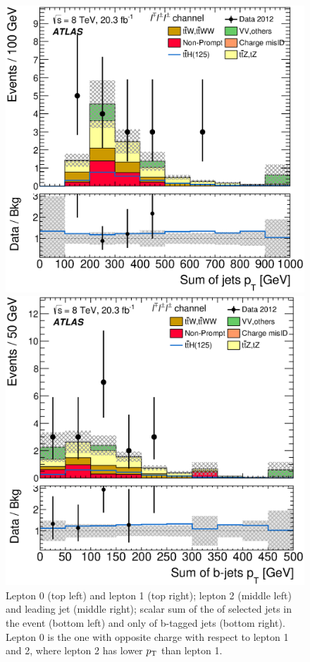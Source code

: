 \begin{figure}[!htbp]
\begin{minipage}[h]{0.4\textwidth}
  \end{minipage}\hfill
  \begin{minipage}[h]{0.4\textwidth}
    \centering \includegraphics[width=\textwidth]{figs/results/results_new/3lep_SR_SumPtJet}
  \end{minipage}\hfill
  \begin{minipage}[h]{0.4\textwidth}
    \centering \includegraphics[width=\textwidth]{figs/results/results_new/3lep_SR_SumPtBJet}
  \end{minipage}\hfill
  \caption{Lepton 0 \pt (top left) and lepton 1 \pt (top right); 
    lepton 2 \pt (middle left) and leading jet \pt (middle right); 
    scalar sum of the \pt of selected jets in the event (bottom left) and only of b-tagged jets (bottom right).
    Lepton 0 is the one with opposite charge with respect to lepton 1 and 2, where lepton 2 has lower $p_{\mathrm{T}}$ than lepton 1.}
  \label{figure:results_3l_jet}
\end{figure} 

